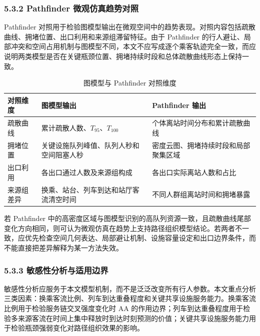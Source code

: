 \documentclass[UTF8,a4paper,12pt]{ctexart}
\begin{document}
\subsubsection{5.3.2 Pathfinder 微观仿真趋势对照}

Pathfinder 对照用于检验图模型输出在微观空间中的趋势表现。对照内容包括疏散曲线、拥堵位置、出口利用和来源组滞留特征。由于 Pathfinder 的行人避让、局部冲突和空间占用机制与图模型不同，本文不应写成逐个乘客轨迹完全一致，而应说明两类模型是否在关键瓶颈位置、拥堵持续时段和总体疏散曲线形态上保持一致。

\begin{table}[htbp]
\centering
\caption{图模型与 Pathfinder 对照维度}
\small
\begin{tabular}{p{}p{}p{}}
\toprule
对照维度 & 图模型输出 & Pathfinder 输出 \\
\midrule
疏散曲线 & 累计疏散人数、\(T_{95}\)、\(T_{100}\) & 个体离站时间分布和累计疏散曲线 \\
拥堵位置 & 关键设施队列峰值、队列人秒和空间阻塞人秒 & 密度云图、拥堵持续时段和局部聚集区域 \\
出口利用 & 各出口通过人数及来源组构成 & 各出口实际离站人数和占比 \\
来源组差异 & 换乘、站台、列车到达和站厅客流清空时间 & 不同人群组离站时间和拥堵暴露 \\
\bottomrule
\end{tabular}
\end{table}

若 Pathfinder 中的高密度区域与图模型识别的高队列资源一致，且疏散曲线尾部变化方向相同，则可认为微观仿真在趋势上支持路径组织模型结论。若两者不一致，应优先检查空间几何表达、局部避让机制、设施容量设定和出口边界条件，而不能直接把差异解释为某一方法失效。

\subsubsection{5.3.3 敏感性分析与适用边界}

敏感性分析应服务于本文模型机制，而不是泛泛改变所有行人参数。本文重点分析三类因素：换乘客流比例、列车到达重叠程度和关键共享设施服务能力。换乘客流比例用于检验服务链交叉强度变化时 AA 的作用边界；列车到达重叠程度用于检验多来源客流在时间上集中释放时到达时刻预测的价值；关键共享设施服务能力用于检验瓶颈强弱变化对路径组织效果的影响。
\end{document}

